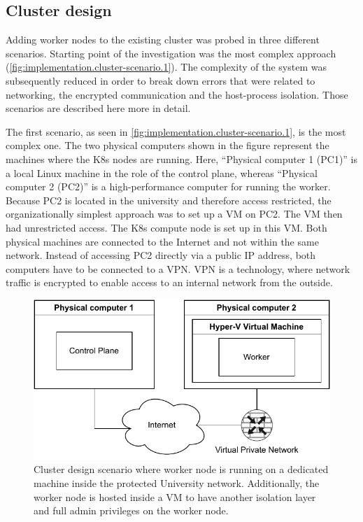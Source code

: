 \subsection{Cluster design}
Adding worker nodes to the existing cluster was probed in three different scenarios. Starting point of the investigation was the most complex approach (\autoref{fig:implementation.cluster-scenario.1}). The complexity of the system was subsequently reduced in order to break down errors that were related to networking, the encrypted communication and the host-process isolation.
Those scenarios are described here more in detail.

The first scenario, as seen in \autoref{fig:implementation.cluster-scenario.1}, is the most complex one. The two physical computers shown in the figure represent the machines where the \ac{K8s} nodes are running. Here, \enquote{Physical computer 1 (PC1)} is a local Linux machine in the role of the control plane, whereas \enquote{Physical computer 2 (PC2)} is a high-performance computer for running the worker. Because PC2 is located in the university and therefore access restricted, the organizationally simplest approach was to set up a \ac{VM} on PC2. The \ac{VM} then had unrestricted access. The \ac{K8s} compute node is set up in this \ac{VM}.
Both physical machines are connected to the Internet and not within the same network. Instead of accessing PC2 directly via a public \ac{IP} address, both computers have to be connected to a \ac{VPN}. \ac{VPN} is a technology, where network traffic is encrypted to enable access to an internal network from the outside.

\begin{figure}[ht]
	\centering
	\includegraphics[width=.8\textwidth]{Figures/Cluster-scenarios-1.pdf}
	\caption{Cluster design scenario where worker node is running on a dedicated machine inside the protected University network. Additionally, the worker node is hosted inside a \ac{VM} to have another isolation layer and full admin privileges on the worker node.}
	\label{fig:implementation.cluster-scenario.1}
\end{figure}


